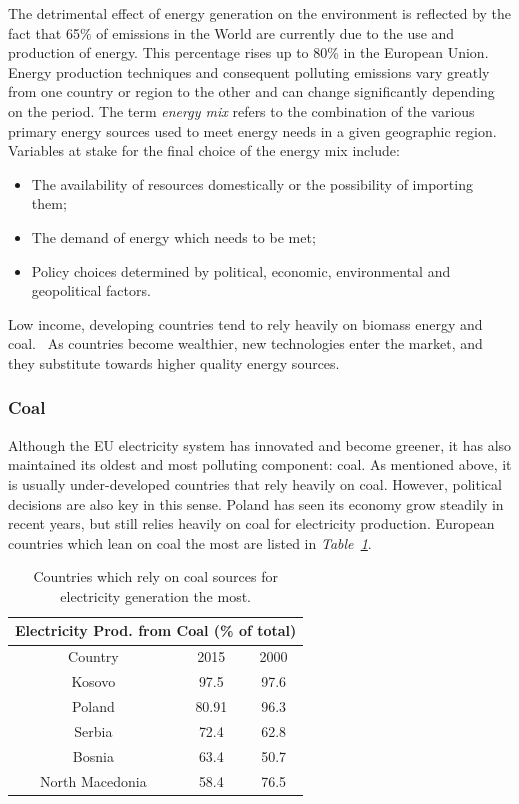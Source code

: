 \documentclass[a4paper,12pt]{book}
\begin{document}
The detrimental effect of energy generation on the environment is reflected by the fact that 65\% of emissions in the World are currently due to the use and production of energy. This percentage rises up to 80\% in the European Union.~\cite{marrero2010greenhouse} Energy production techniques and consequent polluting emissions vary greatly from one country or region to the other and can change significantly depending on the period. The term \textit{energy mix} refers to the combination of the various primary energy sources used to meet energy needs in a given geographic region. Variables at stake for the final choice of the energy mix include:

\begin{itemize}

\item The availability of resources domestically or the possibility of importing them;
\item The demand of energy which needs to be met;
\item Policy choices determined by political, economic, environmental and geopolitical factors.

\end{itemize}

Low income, developing countries tend to rely heavily on biomass energy and coal.~\cite{international2009energy} As countries become wealthier, new technologies enter the market, and they substitute towards higher quality energy sources.~\cite{csereklyei2016energy}

\subsubsection*{Coal}

Although the EU electricity system has innovated and become greener, it has also maintained its oldest and most polluting component: coal. As mentioned above, it is usually under-developed countries that rely heavily on coal. However, political decisions are also key in this sense. Poland has seen its economy grow steadily in recent years, but still relies heavily on coal for electricity production. European countries which lean on coal the most are listed in \textit{Table~\ref{Tab:gen}}.

\begin{table}[tb]
\begin{center}
\begin{tabular}{|c|c|c|}
\hline
\multicolumn{3}{|c|}{Electricity Prod. from Coal (\% of total)}\\
\hline
Country & 2015 & 2000 \\
\hline
Kosovo & 97.5 & 97.6\\
Poland & 80.91 & 96.3 \\
Serbia & 72.4 & 62.8 \\
Bosnia & 63.4 & 50.7\\
North Macedonia & 58.4 & 76.5\\
\hline
\end{tabular}
\caption{Countries which rely on coal sources for electricity generation the most.}
\label{Tab:gen}
\end{center}
\end{table}
\end{document}
